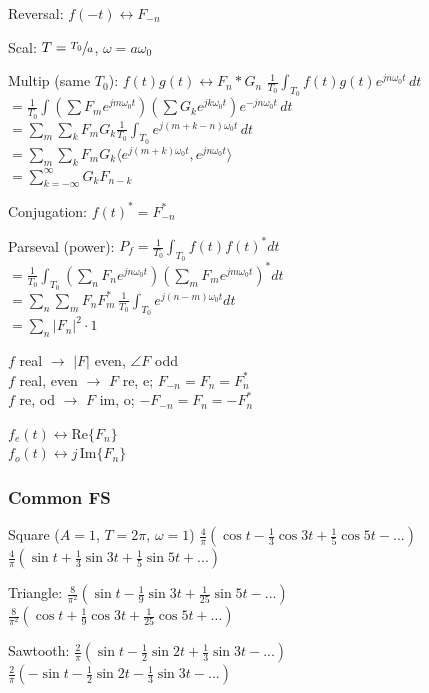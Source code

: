 \documentclass[4pt]{article}
\theoremstyle{definition}
\theoremstyle{definition}
\renewcommand{\o}{\omega}
\newcommand{\ra}{\rightarrow}
\newcommand{\lra}{\leftrightarrow}
\begin{document}
\begin{landscape}
\begin{multicols}{3}
    Reversal: $f(-t)\lra F_{-n}$

    Scal: $T = \sfrac {T_0} a$, $\o = a\o_0$

    Multip (same $T_0$): $f(t) g(t) \lra F_n * G_n$ 
        $\frac 1{T_0}  \int_{T_0} f(t) g(t) e^{jn\o_0 t}\, dt$\\
        $ = \frac{1}{T_0} \int (\sum F_m e^{jm\o_0 t}) (\sum G_k e^{jk\o_0 t}) e^{-jn\o_0 t} \, dt$ \\
        $ = \sum_m \sum_k F_m G_k \frac{1}{T_0} \int_{T_0} e^{j(m+k-n)\o_0 t} \, dt$\\
        $ = \sum_m \sum_k F_m G_k \langle e^{j(m+k)\o_0 t}, e^{jn\o_0 t}\rangle$\\
        $ = \sum_{k=-\infty}^{\infty} G_k F_{n-k}$
        
    Conjugation: $f(t)^* = F^*_{-n}$

    Parseval (power): \(P_f = \frac 1{T_0}\int_{T_0} f(t) f(t)^* dt\)\\
    \(=\frac{1}{T_0}\int_{T_0} (\sum_n F_n e^{jn\o_0t})(\sum_m F_m e^{jm\o_0t})^* dt\)\\
    \(=\sum_n \sum_m  F_n F_m^* \, \frac{1}{T_0}\int_{T_0} e^{j(n-m)\o_0t} dt\)\\
    \(=\sum_n |F_n|^2 \cdot 1\)

        $f$ real $\ra$ $|F|$ even, $\angle F$ odd\\
        $f$ real, even $\ra$ $F$ re, e; $F_{-n} = F_n = F_n^*$\\
        $f$ re, od $\ra$ $F$ im, o; $-F_{-n} = F_n = -F_n^*$

        $f_e(t) \lra \mathrm{Re}\{ F_n\}$\\
        $f_o(t) \lra j \,\mathrm{Im} \{F_n\}$
\columnbreak
\subsubsection*{Common FS}
    Square ($A=1$, $T=2\pi$, $\omega = 1$) 
        $\frac{4}{\pi}(\cos t - \frac{1}{3}\cos 3t + \frac{1}{5} \cos 5t- ...)$\\
        $\frac{4}{\pi}(\sin t + \frac 1 3 \sin 3t + \frac 1 5 \sin 5t + ...)$

    Triangle: 
        $\frac{8}{\pi^2}(\sin t - \frac{1}{9} \sin 3t + \frac{1}{25} \sin 5t - ...)$\\
        $\frac{8}{\pi^2}(\cos t + \frac 1 9 \cos 3t + \frac 1 {25} \cos 5t + ...)$

    Sawtooth:   
        $\frac 2{\pi} (\sin t - \frac{1}{2} \sin 2t + \frac{1}{3} \sin 3t - ...)$\\
        $\frac 2{\pi} (-\sin t - \frac{1}{2} \sin 2t - \frac{1}{3} \sin 3t - ...)$


\end{multicols}
\end{landscape}
\end{document}
